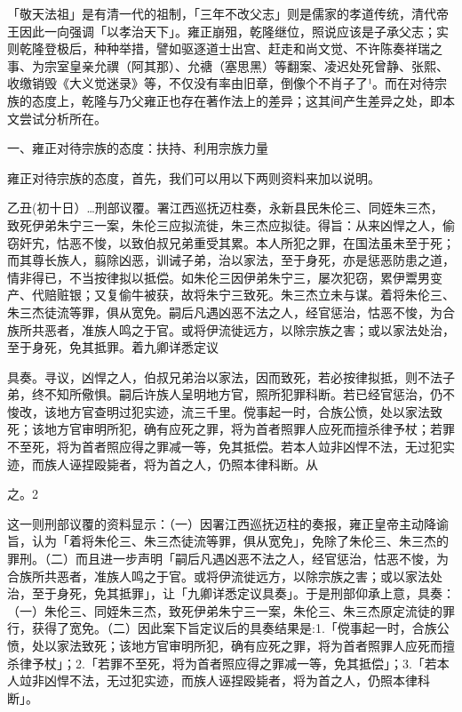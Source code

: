 「敬天法祖」是有清一代的祖制，「三年不改父志」则是儒家的孝道传统，清代帝王因此一向强调「以孝治天下」。雍正崩殂，乾隆继位，照说应该是子承父志；实则乾隆登极后，种种举措，譬如驱逐道士出宫、赶走和尚文觉、不许陈奏祥瑞之事、为宗室皇亲允禩（阿其那）、允禟（塞思黑）等翻案、凌迟处死曾静、张熙、收缴销毁《大义觉迷录》等，不仅没有率由旧章，倒像个不肖子了¹。而在对待宗族的态度上，乾隆与乃父雍正也存在著作法上的差异；这其间产生差异之处，即本文尝试分析所在。

一、雍正对待宗族的态度：扶持、利用宗族力量

雍正对待宗族的态度，首先，我们可以用以下两则资料来加以说明。

\begin{BookQuote}
乙丑(初十日）…刑部议覆。署江西巡抚迈柱奏，永新县民朱伦三、同姪朱三杰，致死伊弟朱宁三一案，朱伦三应拟流徙，朱三杰应拟徒。得旨：从来凶悍之人，偷窃奸宄，怙恶不悛，以致伯叔兄弟重受其累。本人所犯之罪，在国法虽未至于死；而其尊长族人，翦除凶恶，训诫子弟，治以家法，至于身死，亦是惩恶防患之道，情非得已，不当按律拟以抵偿。如朱伦三因伊弟朱宁三，屡次犯窃，累伊鬻男变产、代赔赃银；又复偷牛被获，故将朱宁三致死。朱三杰立未与谋。着将朱伦三、朱三杰徒流等罪，俱从宽免。嗣后凡遇凶恶不法之人，经官惩治，怙恶不悛，为合族所共恶者，准族人鸣之于官。或将伊流徙远方，以除宗族之害；或以家法处治，至于身死，免其抵罪。着九卿详悉定议
\end{BookQuote}

\vfill
\begin{BookNotes}
\end{BookNotes}

\begin{BookQuote}
具奏。寻议，凶悍之人，伯叔兄弟治以家法，因而致死，若必按律拟抵，则不法子弟，终不知所儆惧。嗣后许族人呈明地方官，照所犯罪科断。若已经官惩治，仍不悛改，该地方官查明过犯实迹，流三千里。傥事起一时，合族公愤，处以家法致死；该地方官审明所犯，确有应死之罪，将为首者照罪人应死而擅杀律予杖；若罪不至死，将为首者照应得之罪减一等，免其抵偿。若本人竝非凶悍不法，无过犯实迹，而族人诬捏殴毙者，将为首之人，仍照本律科断。从
\end{BookQuote}

之。2

这一则刑部议覆的资料显示：（一）因署江西巡抚迈柱的奏报，雍正皇帝主动降谕旨，认为「着将朱伦三、朱三杰徒流等罪，俱从宽免」，免除了朱伦三、朱三杰的罪刑。（二）而且进一步声明「嗣后凡遇凶恶不法之人，经官惩治，怙恶不悛，为合族所共恶者，准族人鸣之于官。或将伊流徙远方，以除宗族之害；或以家法处治，至于身死，免其抵罪」，让「九卿详悉定议具奏」。于是刑部仰承上意，具奏：（一）朱伦三、同姪朱三杰，致死伊弟朱宁三一案，朱伦三、朱三杰原定流徒的罪行，获得了宽免。（二）因此案下旨定议后的具奏结果是:1.「傥事起一时，合族公愤，处以家法致死；该地方官审明所犯，确有应死之罪，将为首者照罪人应死而擅杀律予杖」；2.「若罪不至死，将为首者照应得之罪减一等，免其抵偿」；3.「若本人竝非凶悍不法，无过犯实迹，而族人诬捏殴毙者，将为首之人，仍照本律科断」。

